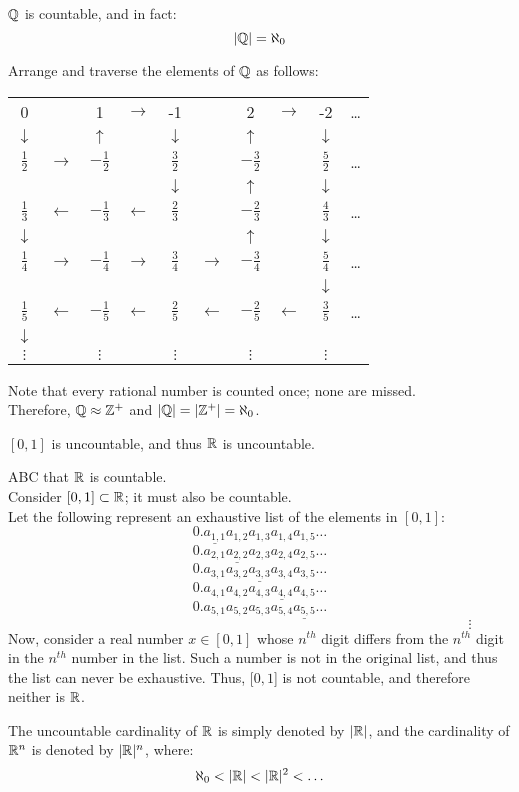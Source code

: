 \documentclass[letterpaper,12pt,fleqn]{article}
\renewcommand{\u}{\underline}
\begin{document}
\begin{theorem}
$\mathbb{Q}$ is countable, and in fact:
\[\lvert\mathbb{Q}\rvert=\aleph_0\]
\end{theorem}
\begin{theorem}
Arrange and traverse the elements of $\mathbb{Q}$ as follows:

\begin{tabular}{cccccccccc}
0 & & 1 & $\rightarrow$ & -1 & & 2 & $\rightarrow$ & -2 & \ldots \\
  $\downarrow$ & & $\uparrow$ & & $\downarrow$ & & $\uparrow$ & &
    $\downarrow$ & \\
$\frac{1}{2}$ & $\rightarrow$ & $-\frac{1}{2}$ & &
    $\frac{3}{2}$ & & $-\frac{3}{2}$ & & $\frac{5}{2}$ & \ldots \\
  & & & & $\downarrow$ & & $\uparrow$ & & $\downarrow$ & \\
$\frac{1}{3}$ & $\leftarrow$ & $-\frac{1}{3}$ & $\leftarrow$ &
    $\frac{2}{3}$ & & $-\frac{2}{3}$ & & $\frac{4}{3}$ & \ldots \\
  $\downarrow$ & & & & & & $\uparrow$ & & $\downarrow$ & \\
$\frac{1}{4}$ & $\rightarrow$ & $-\frac{1}{4}$ & $\rightarrow$ &
    $\frac{3}{4}$ & $\rightarrow$ & $-\frac{3}{4}$ & & $\frac{5}{4}$ & \ldots \\
  & & & & & & & & $\downarrow$ & \\
$\frac{1}{5}$ & $\leftarrow$ & $-\frac{1}{5}$ & $\leftarrow$ &
    $\frac{2}{5}$ & $\leftarrow$ & $-\frac{2}{5}$ & $\leftarrow$ &
    $\frac{3}{5}$ & \ldots \\
  $\downarrow$ & & & & & & & & & \\
$\vdots$ & & $\vdots$ & & $\vdots$ & & $\vdots$ & & $\vdots$ & \\
\end{tabular}

Note that every rational number is counted once; none are missed. \\
Therefore, $\mathbb{Q}\approx\mathbb{Z}^+$ and $\lvert\mathbb{Q}\rvert=\lvert\mathbb{Z}^+\rvert=\aleph_0$.
\end{theorem}
\begin{theorem}
$[0,1]$ is uncountable, and thus $\mathbb{R}$ is uncountable.
\end{theorem}
\begin{theproof}
ABC that $\mathbb{R}$ is countable. \\
Consider $[0,1]\subset\mathbb{R}$; it must also be countable. \\
Let the following represent an exhaustive list of the elements in $[0,1]$: \\
\[0.\u{a_{1,1}}a_{1,2}a_{1,3}a_{1,4}a_{1,5}\ldots\]
\[0.a_{2,1}\u{a_{2,2}}a_{2,3}a_{2,4}a_{2,5}\ldots\]
\[0.a_{3,1}a_{3,2}\u{a_{3,3}}a_{3,4}a_{3,5}\ldots\]
\[0.a_{4,1}a_{4,2}a_{4,3}\u{a_{4,4}}a_{4,5}\ldots\]
\[0.a_{5,1}a_{5,2}a_{5,3}a_{5,4}\u{a_{5,5}}\ldots\]
\[\hspace{5in}\vdots\]
Now, consider a real number $x\in[0,1]$ whose $n^{th}$ digit differs from the
$n^{th}$ digit in the $n^{th}$ number in the list. Such a number is not in the
original list, and thus the list can never be exhaustive. Thus, $[0,1$] is not
countable, and therefore neither is $\mathbb{R}$.
\end{theproof}
The uncountable cardinality of $\mathbb{R}$ is simply denoted by $\lvert\mathbb{R}\rvert$, and the
cardinality of $\mathbb{R}^n$ is denoted by $\lvert\mathbb{R}\rvert^n$, where:
\[\aleph_0<\lvert\mathbb{R}\rvert<\lvert\mathbb{R}\rvert^2<\ldots\]
\end{document}
